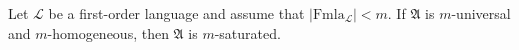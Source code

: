 Let $\mathcal{L}$ be a first-order language and assume that $|\text{Fmla}_{\mathcal{L}}| < m$. If $\mathfrak{A}$ is $m$-universal and $m$-homogeneous, then $\mathfrak{A}$ is $m$-saturated.
